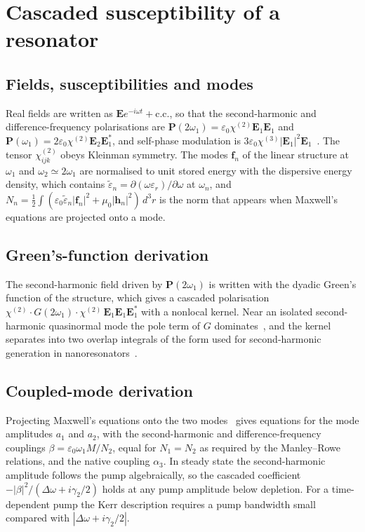 \documentclass[aps,prapplied,onecolumn,superscriptaddress,longbibliography,nofootinbib]{revtex4-2}
\newcommand{\chitwo}{\chi^{(2)}}
\newcommand{\chithree}{\chi^{(3)}}
\newcommand{\Dom}{\Delta\omega}
\newcommand{\f}{\mathbf f}
\begin{document}
\section{Cascaded susceptibility of a resonator}\label{sec:theory}

\subsection{Fields, susceptibilities and modes}

Real fields are written as $\mathbf E e^{-i\omega t}+\mathrm{c.c.}$, so
that the second-harmonic and difference-frequency polarisations are
$\mathbf P(2\omega_1)=\varepsilon_0\chitwo\mathbf E_1\mathbf E_1$ and
$\mathbf P(\omega_1)=2\varepsilon_0\chitwo\mathbf E_2\mathbf E_1^*$, and
self-phase modulation is $3\varepsilon_0\chithree|\mathbf E_1|^2\mathbf E_1$~\cite{boyd2020}.
The tensor $\chitwo_{ijk}$ obeys Kleinman symmetry.  The modes $\f_n$ of the
linear structure at $\omega_1$ and $\omega_2\simeq2\omega_1$ are
normalised to unit stored energy with the dispersive energy density, which
contains $\tilde\varepsilon_n=\partial(\omega\varepsilon_r)/\partial\omega$
at $\omega_n$, and
$N_n=\tfrac12\int(\varepsilon_0\tilde\varepsilon_n|\f_n|^2+\mu_0|\mathbf h_n|^2)\,d^3r$
is the norm that appears when Maxwell's equations are projected onto a
mode.

\subsection{Green's-function derivation}

The second-harmonic field driven by $\mathbf P(2\omega_1)$ is written with
the dyadic Green's function of the structure, which gives a cascaded
polarisation $\chitwo\cdot G(2\omega_1)\cdot\chitwo\,\mathbf E_1\mathbf E_1\mathbf E_1^*$
with a nonlocal kernel.  Near an isolated second-harmonic quasinormal mode
the pole term of $G$ dominates~\cite{sauvan2013,lalanne2018}, and the
kernel separates into two overlap integrals of the form used for
second-harmonic generation in nanoresonators~\cite{gigli2020}.

\subsection{Coupled-mode derivation}

Projecting Maxwell's equations onto the two modes~\cite{rodriguez2007,johnson2002}
gives equations for the mode amplitudes $a_1$ and $a_2$, with the
second-harmonic and difference-frequency couplings
$\beta=\varepsilon_0\omega_1M/N_2$, equal for $N_1=N_2$ as required by
the Manley--Rowe relations, and the native coupling $\alpha_3$.  In steady
state the second-harmonic amplitude follows the pump algebraically, so the
cascaded coefficient $-|\beta|^2/(\Dom+i\gamma_2/2)$ holds at any pump
amplitude below depletion.  For a time-dependent pump the Kerr description
requires a pump bandwidth small compared with $|\Dom+i\gamma_2/2|$.
\end{document}
